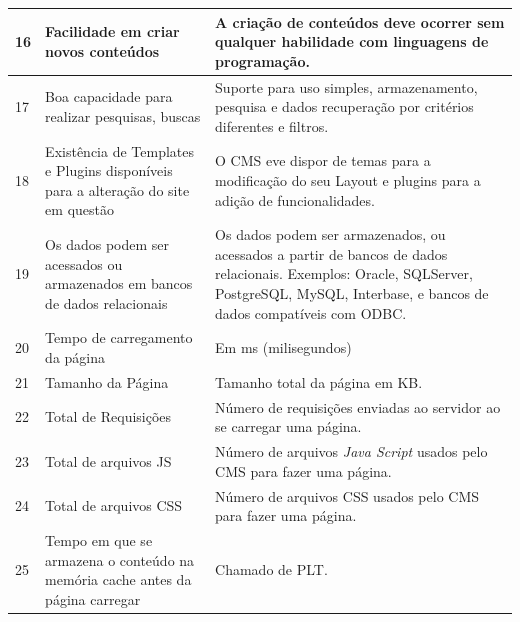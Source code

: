 \begin{apendicesenv}
\begin{landscape}
\begin{longtable}{|p{10pt}|p{220pt}|p{415pt}|}
 	 {\raggedright {16}}
 	  	 	 	 	 & {\raggedright {Facilidade em criar novos conteúdos}}
 	  	 	 	 	 & {\raggedright {A criação de conteúdos deve ocorrer sem qualquer habilidade com linguagens de programação. \cite{gadja}}}\\
 	  	 	 	 	\hline
 	 {\raggedright {17}}
 	  	 	 	 	 & {\raggedright {Boa capacidade para realizar pesquisas, buscas}}
 	  	 	 	 	 & {\raggedright {Suporte para uso simples, armazenamento, pesquisa e dados
 	  	 	 	 	 recuperação por critérios diferentes e filtros.} \cite{Ennert2012}}\\
 	  	 	 	 	\hline
 	 {\raggedright {18}}
 	  	 	 	 	 & {\raggedright {Existência de Templates e Plugins disponíveis para a alteração do site em questão}}
 	  	 	 	 	 & {\raggedright {O CMS eve dispor de temas para a modificação do seu Layout e plugins para a adição de funcionalidades.\cite{gadja}}}\\
 	  	 	 	 	\hline
 	  	 	 	 	{\raggedright {19}}
 	  	 	 	 	 & {\raggedright {Os dados podem ser acessados ou armazenados em bancos de dados relacionais}}
 	  	 	 	 	 & {\raggedright {Os dados podem ser armazenados, ou acessados a partir de bancos de dados relacionais. Exemplos:
 	  	 	 	 	  Oracle, SQLServer, PostgreSQL,
 	  MySQL, Interbase, e bancos de dados compatíveis com ODBC. \cite{gadja}}}\\
 	  	 	 	 	 	 	 	 	\hline 
 	 {\raggedright {20}}
 	  	 	 	 	 & {\raggedright {Tempo de carregamento da página}}
 	  	 	 	 	 & {\raggedright {Em ms (milisegundos)\cite{patel}}}\\
 	  	 	 	 	\hline
{\raggedright {21}}
 	 	 & {\raggedright {Tamanho da Página}}
 	 	 & {\raggedright {Tamanho total da página em KB. \cite{patel}}}\\
 	 	\hline
 	{\raggedright {22}}
 	 	 & {\raggedright {Total de Requisições}}
 	 	 & {\raggedright {Número de requisições enviadas ao servidor ao se carregar uma página. \cite{patel}}}\\
 	 	\hline
 	{\raggedright {23}}
 	 	 & {\raggedright {Total de arquivos JS}}
 	 	 & {\raggedright {Número de arquivos \textit{Java Script} usados pelo CMS para fazer uma página. \cite{patel}}}\\
 	 	\hline
 	 	{\raggedright {24}}
 	 	 	 	 & {\raggedright {Total de arquivos CSS}}
 	 	 	 	 & {\raggedright {Número de arquivos CSS usados pelo CMS para fazer uma página. \cite{patel}}}\\
 	 	 	 	\hline
 	 {\raggedright {25}}
 	  	 	 	 	 & {\raggedright {Tempo em que se armazena o conteúdo na memória cache antes da página carregar}}
 	  	 	 	 	 & {\raggedright {Chamado de PLT.\cite{patel}}}\\
 	  	 	 	 	\hline
 	  	 	 	 	

\end{longtable}
\end{landscape}
\end{apendicesenv}
